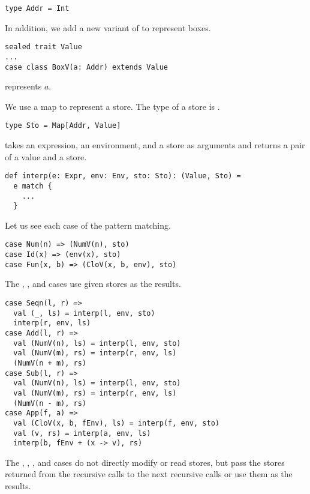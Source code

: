 \begin{verbatim}
type Addr = Int
\end{verbatim}

In addition, we add a new variant of  to represent boxes.

\begin{verbatim}
sealed trait Value
...
case class BoxV(a: Addr) extends Value
\end{verbatim}

 represents $a$.

We use a map to represent a store. The type of a store is .

\begin{verbatim}
type Sto = Map[Addr, Value]
\end{verbatim}

 takes an expression, an environment, and a store as arguments and
returns a pair of a value and a store.

\begin{verbatim}
def interp(e: Expr, env: Env, sto: Sto): (Value, Sto) =
  e match {
    ...
  }
\end{verbatim}

Let us see each case of the pattern matching.

\begin{verbatim}
case Num(n) => (NumV(n), sto)
case Id(x) => (env(x), sto)
case Fun(x, b) => (CloV(x, b, env), sto)
\end{verbatim}

The , , and  cases use given stores as the results.

\begin{verbatim}
case Seqn(l, r) =>
  val (_, ls) = interp(l, env, sto)
  interp(r, env, ls)
case Add(l, r) =>
  val (NumV(n), ls) = interp(l, env, sto)
  val (NumV(m), rs) = interp(r, env, ls)
  (NumV(n + m), rs)
case Sub(l, r) =>
  val (NumV(n), ls) = interp(l, env, sto)
  val (NumV(m), rs) = interp(r, env, ls)
  (NumV(n - m), rs)
case App(f, a) =>
  val (CloV(x, b, fEnv), ls) = interp(f, env, sto)
  val (v, rs) = interp(a, env, ls)
  interp(b, fEnv + (x -> v), rs)
\end{verbatim}

The , , , and  cases do not directly
modify or read stores, but pass the stores returned from the recursive calls to the
next recursive calls or use them as the results.


